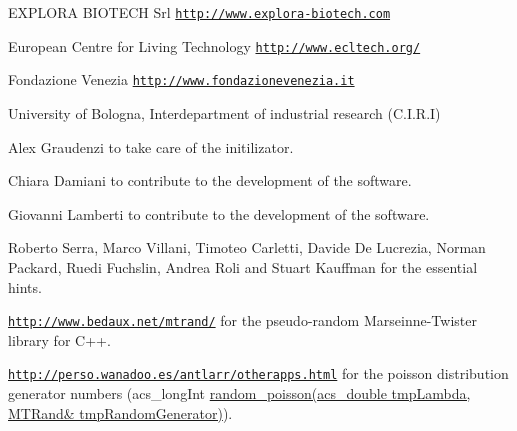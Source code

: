 \begin{DoxyItemize}
\item E\-X\-P\-L\-O\-R\-A B\-I\-O\-T\-E\-C\-H Srl \href{http://www.explora-biotech.com}{\tt http\-://www.\-explora-\/biotech.\-com}
\item European Centre for Living Technology \href{http://www.ecltech.org/}{\tt http\-://www.\-ecltech.\-org/}
\item Fondazione Venezia \href{http://www.fondazionevenezia.it}{\tt http\-://www.\-fondazionevenezia.\-it}
\item University of Bologna, Interdepartment of industrial research (C.\-I.\-R.\-I)
\item Alex Graudenzi to take care of the initilizator.
\item Chiara Damiani to contribute to the development of the software.
\item Giovanni Lamberti to contribute to the development of the software.
\item Roberto Serra, Marco Villani, Timoteo Carletti, Davide De Lucrezia, Norman Packard, Ruedi Fuchslin, Andrea Roli and Stuart Kauffman for the essential hints.
\item \href{http://www.bedaux.net/mtrand/}{\tt http\-://www.\-bedaux.\-net/mtrand/} for the pseudo-\/random Marseinne-\/\-Twister library for C++.
\item \href{http://perso.wanadoo.es/antlarr/otherapps.html}{\tt http\-://perso.\-wanadoo.\-es/antlarr/otherapps.\-html} for the poisson distribution generator numbers (acs\-\_\-long\-Int \hyperlink{a00028_a22cddb6ffcf2250e0c90bc913728350f}{random\-\_\-poisson(acs\-\_\-double tmp\-Lambda, M\-T\-Rand\& tmp\-Random\-Generator)}). 
\end{DoxyItemize}